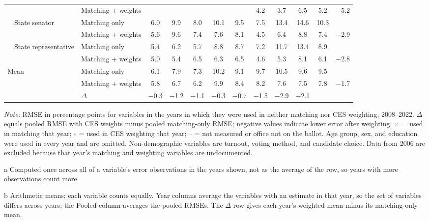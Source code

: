 \begin{table}[!htbp]
{\begin{threeparttable}
\begin{tabular}{llcccccccccc}
 & Matching + weights &  &  &  &  &  & 4.2 & 3.7 & 6.5 & 5.2 & $-$5.2 \\
\addlinespace[0.1em]
~~State senator & Matching only & 6.0 & 9.9 & 8.0 & 10.1 & 9.5 & 7.5 & 13.4 & 14.6 & 10.3 & \\
 & Matching + weights & 5.6 & 9.6 & 7.4 & 7.6 & 8.1 & 4.5 & 6.4 & 8.8 & 7.4 & $-$2.9 \\
\addlinespace[0.1em]
~~State representative & Matching only & 5.4 & 6.2 & 5.7 & 8.8 & 8.7 & 7.2 & 11.7 & 13.4 & 8.9 & \\
 & Matching + weights & 5.0 & 5.4 & 6.5 & 6.3 & 6.5 & 4.6 & 5.3 & 8.1 & 6.1 & $-$2.8 \\
\midrule
Mean\tnote{b} & Matching only & 6.1 & 7.9 & 7.3 & 10.2 & 9.1 & 9.7 & 10.5 & 9.6 & 9.5 & \\
 & Matching + weights & 5.8 & 6.7 & 6.2 & 9.9 & 8.4 & 8.2 & 7.6 & 7.5 & 7.8 & $-$1.7 \\
 & $\Delta$ & $-$0.3 & $-$1.2 & $-$1.1 & $-$0.3 & $-$0.7 & $-$1.5 & $-$2.9 & $-$2.1 & & \\
\bottomrule
\end{tabular}
\begin{tablenotes}
\footnotesize
\item \textit{Note:} RMSE in percentage points for variables in the years in which they were used in neither matching nor CES weighting, 2008--2022. $\Delta$ equals pooled RMSE with CES weights minus pooled matching-only RMSE; negative values indicate lower error after weighting. \textcolor{gray}{$\times$} = used in matching that year; \textcolor{gray}{$\circ$} = used in CES weighting that year; \textcolor{gray}{--} = not measured or office not on the ballot. Age group, sex, and education were used in every year and are omitted. Non-demographic variables are turnout, voting method, and candidate choice. Data from 2006 are excluded because that year's matching and weighting variables are undocumented.
\item[a] Computed once across all of a variable's error observations in the years shown, not as the average of the row, so years with more observations count more.
\item[b] Arithmetic means; each variable counts equally. Year columns average the variables with an estimate in that year, so the set of variables differs across years; the Pooled column averages the pooled RMSEs. The $\Delta$ row gives each year's weighted mean minus its matching-only mean.
\end{tablenotes}
\end{threeparttable}%
}
\end{table}